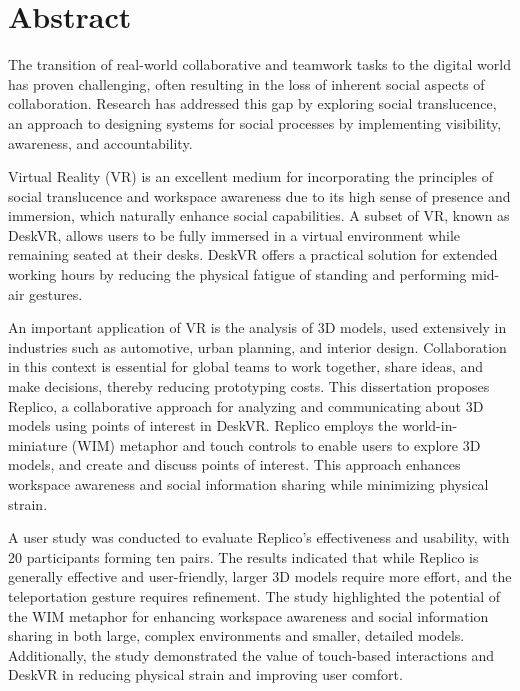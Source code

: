 \chapter*{Abstract}

The transition of real-world collaborative and teamwork tasks to the digital world has proven challenging, often resulting in the loss of inherent social aspects of collaboration. Research has addressed this gap by exploring social translucence, an approach to designing systems for social processes by implementing visibility, awareness, and accountability.

Virtual Reality (VR) is an excellent medium for incorporating the principles of social translucence and workspace awareness due to its high sense of presence and immersion, which naturally enhance social capabilities. A subset of VR, known as DeskVR, allows users to be fully immersed in a virtual environment while remaining seated at their desks. DeskVR offers a practical solution for extended working hours by reducing the physical fatigue of standing and performing mid-air gestures.

An important application of VR is the analysis of 3D models, used extensively in industries such as automotive, urban planning, and interior design. Collaboration in this context is essential for global teams to work together, share ideas, and make decisions, thereby reducing prototyping costs. This dissertation proposes Replico, a collaborative approach for analyzing and communicating about 3D models using points of interest in DeskVR. Replico employs the world-in-miniature (WIM) metaphor and touch controls to enable users to explore 3D models, and create and discuss points of interest. This approach enhances workspace awareness and social information sharing while minimizing physical strain.

A user study was conducted to evaluate Replico's effectiveness and usability, with 20 participants forming ten pairs. The results indicated that while Replico is generally effective and user-friendly, larger 3D models require more effort, and the teleportation gesture requires refinement. The study highlighted the potential of the WIM metaphor for enhancing workspace awareness and social information sharing in both large, complex environments and smaller, detailed models. Additionally, the study demonstrated the value of touch-based interactions and DeskVR in reducing physical strain and improving user comfort.

\vspace{1em}


